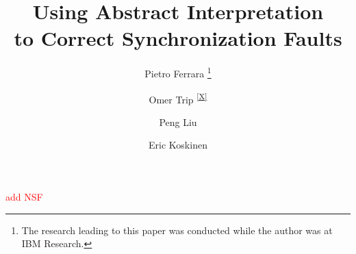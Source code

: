 \documentclass{llncs}
\newcommand{\repthanks}[1]{\textsuperscript{\ref{#1}}}
\begin{document}
\title{Using Abstract Interpretation\\
  to Correct Synchronization Faults}




\author{
  Pietro Ferrara \thanks{The research leading to this paper was conducted while the author was at IBM Research.\protect\label{X}}
  \and Omer Trip \repthanks{X}
  \and Peng Liu 
  \and Eric Koskinen 
}
\maketitle

\newcommand\ignore[1]{}
\newcommand{\pengtodo}[1]{{\bf #1}}
\newcommand{\pietrotodo}[1]{{\bf #1}}

\begin{abstract}
  
\end{abstract}

\textcolor{red}{add NSF}












\vfill
\newpage
\appendix

\end{document}
